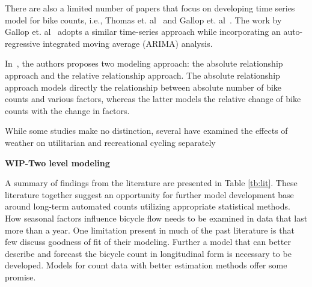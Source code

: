 \documentclass [11pt, proquest] {uwthesis}[2015/03/03]
\begin{document}
There are also a limited number of papers that focus on developing time series model for bike counts, i.e., Thomas et. al~\cite{Thomas:2009aa} and Gallop et. al~\cite{Gallop:2012aa}. The work by Gallop et. al~\cite{Gallop:2012aa} adopts a similar time-series approach while incorporating an auto-regressive integrated moving average (ARIMA) analysis. 

In~\cite{}, the authors proposes two modeling approach: the absolute relationship approach and the relative relationship approach. The absolute relationship approach models directly the relationship between absolute number of bike counts and various factors, whereas the latter models the relative change of bike counts with the change in factors. 

While some studies make no distinction, several have examined the effects of weather on utilitarian and recreational cycling separately~\cite{Brandenburg07, Hanson77, Thomas12}

\textbf{WIP-Two level modeling}
%

A summary of findings from the literature are presented in Table \ref{tb:lit}. These literature together suggest an opportunity for further model development base around long-term automated counts utilizing appropriate statistical methods. How seasonal factors influence bicycle flow needs to be examined in data that last more than a year. One limitation present in much of the past literature is that few discuss goodness of fit of their modeling. Further a model that can better describe and forecast the bicycle count in longitudinal form is necessary to be developed. Models for count data with better estimation methods offer some promise. 
\end{document}
